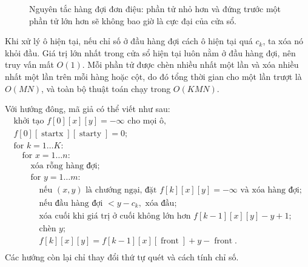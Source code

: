 \documentclass[11pt]{article}
\begin{document}
\begin{figure}[ht]
\centering
{}
\caption{Nguyên tắc hàng đợi đơn điệu: phần tử nhỏ hơn và đứng trước một phần tử lớn hơn sẽ không bao giờ là cực đại của cửa sổ.}
\end{figure}

Khi xử lý ô hiện tại, nếu chỉ số ở đầu hàng đợi cách ô hiện tại quá $c_k$,
ta xóa nó khỏi đầu. Giá trị lớn nhất trong cửa sổ hiện tại luôn nằm ở đầu
hàng đợi, nên truy vấn mất $O(1)$. Mỗi phần tử được chèn nhiều nhất một lần
và xóa nhiều nhất một lần trên mỗi hàng hoặc cột, do đó tổng thời gian cho
một lần trượt là $O(MN)$, và toàn bộ thuật toán chạy trong $O(KMN)$.

Với hướng đông, mã giả có thể viết như sau:
\[
\begin{array}{l}
\text{khởi tạo } f[0][x][y] = -\infty \text{ cho mọi ô,}\\
f[0][\operatorname{startx}][\operatorname{starty}]=0;\\
\text{for } k=1\ldots K:\\
\quad \text{for } x=1\ldots n:\\
\quad\quad \text{xóa rỗng hàng đợi;}\\
\quad\quad \text{for } y=1\ldots m:\\
\quad\quad\quad \text{nếu }(x,y)\text{ là chướng ngại, đặt }
  f[k][x][y]=-\infty\text{ và xóa hàng đợi;}\\
\quad\quad\quad \text{nếu đầu hàng đợi }<y-c_k,\text{ xóa đầu;}\\
\quad\quad\quad \text{xóa cuối khi giá trị ở cuối không lớn hơn }
  f[k-1][x][y]-y+1;\\
\quad\quad\quad \text{chèn }y;\\
\quad\quad\quad f[k][x][y]=
  f[k-1][x][\operatorname{front}]+y-\operatorname{front}.\\
\end{array}
\]
Các hướng còn lại chỉ thay đổi thứ tự quét và cách tính chỉ số.
\end{document}
